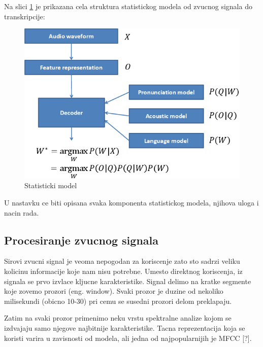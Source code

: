\documentclass[a4paper]{article}
\begin{document}
Na slici \ref{fig:statistical_model} je prikazana cela struktura statistickog modela od zvucnog signala do transkripcije:
\begin{figure}[h!]
  \begin{center}
    \includegraphics[scale=0.4]{statistical_model.png}
  \end{center}
  \caption{Statisticki model}
  \label{fig:statistical_model}
\end{figure}

U nastavku ce biti opisana svaka komponenta statistickog modela, njihova uloga i nacin rada.

\subsection{Procesiranje zvucnog signala}
Sirovi zvucni signal je veoma nepogodan za koriscenje zato sto sadrzi veliku kolicinu informacije koje nam nisu potrebne.
Umesto direktnog koriscenja, iz signala se prvo izvlace kljucne karakteristike.
Signal delimo na kratke segmente koje zovemo prozori (eng. window).
Svaki prozor je duzine od nekoliko milisekundi (obicno 10-30) pri cemu se susedni prozori delom preklapaju.

Zatim na svaki prozor primenimo neku vrstu spektralne analize kojom se izdvajaju samo njegove najbitnije karakteristike.
Tacna reprezentacija koja se koristi varira u zavisnosti od modela, ali jedna od najpopularnijih je MFCC [?].
\end{document}
